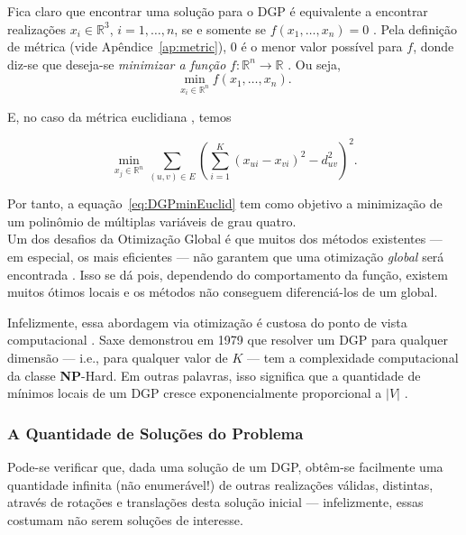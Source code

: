 Fica claro que encontrar uma solução para o DGP é equivalente a encontrar realizações $x_i \in \mathbb{R}^3$, $i=1,\dots,n$, se e somente se $f(x_1,\dots,x_n) = 0$ \cite{libertiEDG}. Pela definição de métrica (vide Apêndice~\ref{ap:metric}), 0 é o menor valor possível para $f$, donde diz-se que deseja-se \textit{minimizar a função} $f: \mathbb{R}^n \longrightarrow \mathbb{R}$ \cite{carlileBook31Coloquio}. Ou seja,
\begin{equation}
	\min_{x_i \in \mathbb{R}^n} f(x_1,\dots,x_n).
\end{equation}

E, no caso da métrica euclidiana \cite{libertiEDG}, temos

\begin{equation}
 \min_{x_j \in \mathbb{R}^n} \sum_{(u,v)\in E} \left(\sum_{i=1}^{K}(x_{ui} - x_{vi})^2 - d_{uv}^2\right)^2.
 \label{eq:DGPminEuclid}
\end{equation}

Por tanto, a equação~\ref{eq:DGPminEuclid} tem como objetivo a minimização de um polinômio de múltiplas variáveis de grau quatro. 
\\

Um dos desafios da Otimização Global é que muitos dos métodos existentes --- em especial, os mais eficientes --- não garantem que uma otimização \textit{global} será encontrada \cite{libertiEDG}. Isso se dá pois, dependendo do comportamento da função, existem muitos ótimos locais e os métodos não conseguem diferenciá-los de um global. %

Infelizmente, essa abordagem via otimização é custosa do ponto de vista computacional \cite{libertiEDG}. Saxe demonstrou em 1979 \cite{Saxe:79} que resolver um DGP para qualquer dimensão --- i.e., para qualquer valor de $K$ --- tem a complexidade computacional da classe \textbf{NP}-Hard. Em outras palavras, isso significa que a quantidade de mínimos locais de um DGP cresce exponencialmente proporcional a $|V|$ \cite{carlileIntroductionMDGP}. 

\subsubsection{A Quantidade de Soluções do Problema}
Pode-se verificar que, dada uma solução de um DGP, obtêm-se facilmente uma quantidade infinita (não enumerável!) de outras realizações válidas, distintas, através de rotações e translações desta solução inicial \cite{carlileBook31Coloquio} --- infelizmente, essas costumam não serem soluções de interesse.

